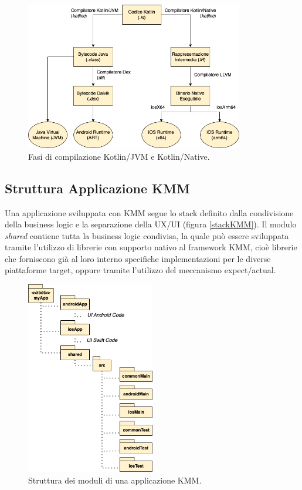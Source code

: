 \begin{figure}[H]
    \centering
    \includegraphics[width=0.85\textwidth]{img/compilatore_kotlin.png}
    \caption{Fasi di compilazione Kotlin/JVM e Kotlin/Native.}
\end{figure}

\subsection{Struttura Applicazione KMM}
Una applicazione sviluppata con KMM segue lo stack definito dalla condivisione della business logic e la separazione della UX/UI (figura \ref{stackKMM}). Il modulo \textit{shared} contiene tutta la business logic condivisa, la quale può essere sviluppata tramite l'utilizzo di librerie con supporto nativo al framework KMM, cioè librerie che forniscono già al loro interno specifiche implementazioni per le diverse piattaforme target, oppure tramite l'utilizzo del meccanismo expect/actual.

\begin{figure}[H]
    \centering
    \includegraphics[width=0.5\textwidth]{img/struttura_app_kmm.png}
    \caption{Struttura dei moduli di una applicazione KMM.}
\end{figure}

